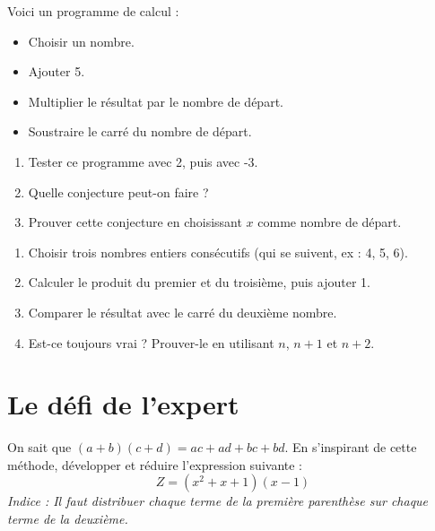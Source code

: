 \documentclass[a4paper]{book}
\begin{document}
    \begin{exercice}
        Voici un programme de calcul :
        \begin{itemize}[label=\textbullet]
            \item Choisir un nombre.
            \item Ajouter 5.
            \item Multiplier le résultat par le nombre de départ.
            \item Soustraire le carré du nombre de départ.
        \end{itemize}
        \begin{enumerate}
            \item Tester ce programme avec 2, puis avec -3.
            \item Quelle conjecture peut-on faire ?
            \item Prouver cette conjecture en choisissant $x$ comme nombre de départ.
        \end{enumerate}
    \end{exercice}
    
    \begin{exercice}
        \begin{enumerate}
            \item Choisir trois nombres entiers consécutifs (qui se suivent, ex : 4, 5, 6).
            \item Calculer le produit du premier et du troisième, puis ajouter 1.
            \item Comparer le résultat avec le carré du deuxième nombre.
            \item Est-ce toujours vrai ? Prouver-le en utilisant $n$, $n+1$ et $n+2$.
        \end{enumerate}
    \end{exercice}
    
    \section{Le défi de l'expert}
    
    \begin{exercice}
        On sait que $(a+b)(c+d) = ac + ad + bc + bd$.
        En s'inspirant de cette méthode, développer et réduire l'expression suivante :
        \[ Z = (x^2 + x + 1)(x - 1) \]
        \textit{Indice : Il faut distribuer chaque terme de la première parenthèse sur chaque terme de la deuxième.}
    \end{exercice}
\end{document}
